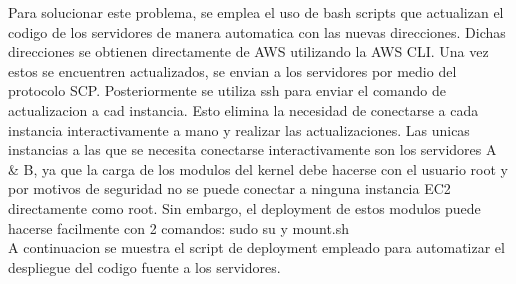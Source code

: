 \documentclass{article}
\begin{document}
Para solucionar este problema, se emplea el uso de bash 
scripts que actualizan el codigo de los servidores de manera
automatica con las nuevas
direcciones. Dichas direcciones se obtienen directamente 
de AWS utilizando la AWS CLI. 
Una vez estos se encuentren actualizados, se envian 
a los servidores por medio del protocolo SCP. Posteriormente 
se utiliza ssh para enviar el comando de actualizacion a cad instancia.
Esto elimina la necesidad de conectarse a cada instancia interactivamente
a mano y realizar las actualizaciones. Las unicas instancias a las 
que se necesita conectarse interactivamente son los servidores A \& B, 
ya que la carga de los modulos del kernel debe hacerse con el usuario 
root y por motivos de seguridad no se puede conectar a ninguna instancia 
EC2 directamente como root. Sin embargo, el deployment de estos 
modulos puede hacerse facilmente con 2 comandos: sudo su y mount.sh\\
A continuacion se muestra el script de deployment empleado 
para automatizar el despliegue del codigo fuente a los servidores.
\end{document}
